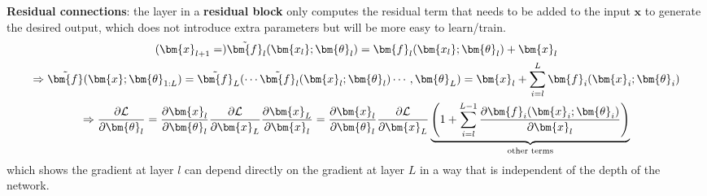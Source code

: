 \textbf{Residual connections}: 
the layer in a \textbf{residual block} only computes the residual term 
that needs to be added to the input $\bm{x}$ to generate the desired output, 
which does not introduce extra parameters but will be more easy to learn/train.
\begin{gather}
    (\bm{x}_{l+1}=)\Tilde{\bm{f}}_l(\bm{x_l};\bm{\theta}_l) = \bm{f}_l(\bm{x_l};\bm{\theta}_l)+\bm{x}_l\\
    \Rightarrow 
    \Tilde{\bm{f}}(\bm{x};\bm{\theta}_{1:L}) 
    = \Tilde{\bm{f}}_L(\cdots\Tilde{\bm{f}}_l(\bm{x}_l;\bm{\theta}_l)\cdots,\bm{\theta}_L) 
    = \bm{x}_l + \sum_{i=l}^{L}\bm{f}_i(\bm{x}_i;\bm{\theta}_i) \\
    \Rightarrow
    \frac{\partial\mathcal{L}}{\partial\bm{\theta}_l}
    = \frac{\partial\bm{x}_{l}}{\partial\bm{\theta}_l}
      \frac{\partial\mathcal{L}}{\partial\bm{x}_{L}}
      \frac{\partial\bm{x}_{L}}{\partial\bm{x}_{l}}
    = \frac{\partial\bm{x}_{l}}{\partial\bm{\theta}_l}
      \frac{\partial\mathcal{L}}{\partial\bm{x}_{L}}
      \underbrace{\left(
        1 + \sum_{i=l}^{L-1}\frac{\partial\bm{f}_i(\bm{x}_i;\bm{\theta}_i)}{\partial\bm{x}_l}
      \right)}_{\text{other terms}}
\end{gather}
which shows the gradient at layer $l$ can depend directly on the gradient at layer $L$ 
in a way that is independent of the depth of the network.



